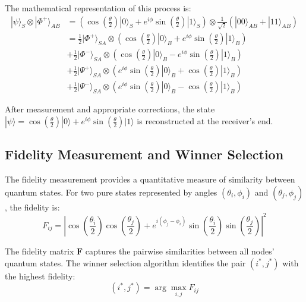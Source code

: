 \documentclass[11pt,a4paper]{article}
\begin{document}
The mathematical representation of this process is:
\begin{align}
|\psi\rangle_S \otimes |\Phi^+\rangle_{AB} &= \left(\cos\left(\frac{\theta}{2}\right)|0\rangle_S + e^{i\phi}\sin\left(\frac{\theta}{2}\right)|1\rangle_S\right) \otimes \frac{1}{\sqrt{2}}(|00\rangle_{AB} + |11\rangle_{AB}) \\
&= \frac{1}{2}|\Phi^+\rangle_{SA} \otimes \left(\cos\left(\frac{\theta}{2}\right)|0\rangle_B + e^{i\phi}\sin\left(\frac{\theta}{2}\right)|1\rangle_B\right) \\
&+ \frac{1}{2}|\Phi^-\rangle_{SA} \otimes \left(\cos\left(\frac{\theta}{2}\right)|0\rangle_B - e^{i\phi}\sin\left(\frac{\theta}{2}\right)|1\rangle_B\right) \\
&+ \frac{1}{2}|\Psi^+\rangle_{SA} \otimes \left(e^{i\phi}\sin\left(\frac{\theta}{2}\right)|0\rangle_B + \cos\left(\frac{\theta}{2}\right)|1\rangle_B\right) \\
&+ \frac{1}{2}|\Psi^-\rangle_{SA} \otimes \left(e^{i\phi}\sin\left(\frac{\theta}{2}\right)|0\rangle_B - \cos\left(\frac{\theta}{2}\right)|1\rangle_B\right)
\end{align}

After measurement and appropriate corrections, the state $|\psi\rangle = \cos\left(\frac{\theta}{2}\right)|0\rangle + e^{i\phi}\sin\left(\frac{\theta}{2}\right)|1\rangle$ is reconstructed at the receiver's end.

\subsection{Fidelity Measurement and Winner Selection}
The fidelity measurement provides a quantitative measure of similarity between quantum states. For two pure states represented by angles $(\theta_i, \phi_i)$ and $(\theta_j, \phi_j)$, the fidelity is:
\begin{equation}
F_{ij} = \left|\cos\left(\frac{\theta_i}{2}\right)\cos\left(\frac{\theta_j}{2}\right) + e^{i(\phi_j-\phi_i)}\sin\left(\frac{\theta_i}{2}\right)\sin\left(\frac{\theta_j}{2}\right)\right|^2
\end{equation}

The fidelity matrix $\mathbf{F}$ captures the pairwise similarities between all nodes' quantum states. The winner selection algorithm identifies the pair $(i^*, j^*)$ with the highest fidelity:
\begin{equation}
(i^*, j^*) = \arg\max_{i,j} F_{ij}
\end{equation}
\end{document}
